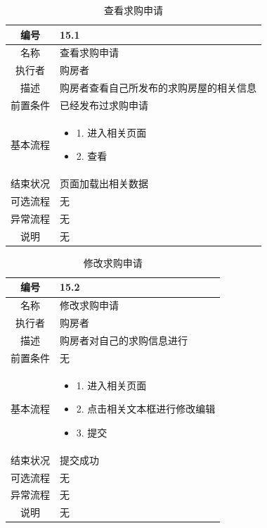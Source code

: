 \begin{table}[htbp]
	\centering
	\begin{tabular}{|c|p{11cm}|}
        \hline
        编号 & 15.1 \\
        \hline
        名称 & 查看求购申请 \\ 
        \hline
        执行者 & 购房者 \\
        \hline
        描述 & 购房者查看自己所发布的求购房屋的相关信息 \\
        \hline
        前置条件 & 已经发布过求购申请 \\
        \hline
        基本流程 & \begin{itemize}
            \item 1. 进入相关页面
            \item 2. 查看
        \end{itemize} \\
        \hline
        结束状况 & 页面加载出相关数据 \\
        \hline
        可选流程 & 无 \\
        \hline
        异常流程 & 无 \\
        \hline
        说明 & 无 \\
        \hline
    \end{tabular}
    \caption{查看求购申请}
\end{table}

\begin{table}[htbp]
	\centering
	\begin{tabular}{|c|p{11cm}|}
        \hline
        编号 & 15.2 \\
        \hline
        名称 & 修改求购申请 \\ 
        \hline
        执行者 & 购房者 \\
        \hline
        描述 & 购房者对自己的求购信息进行 \\
        \hline
        前置条件 & 无 \\
        \hline
        基本流程 & \begin{itemize}
            \item 1. 进入相关页面
            \item 2. 点击相关文本框进行修改编辑
            \item 3. 提交
        \end{itemize} \\
        \hline
        结束状况 & 提交成功 \\
        \hline
        可选流程 & 无 \\
        \hline
        异常流程 & 无 \\
        \hline
        说明 & 无 \\
        \hline
    \end{tabular}
    \caption{修改求购申请}
\end{table}

